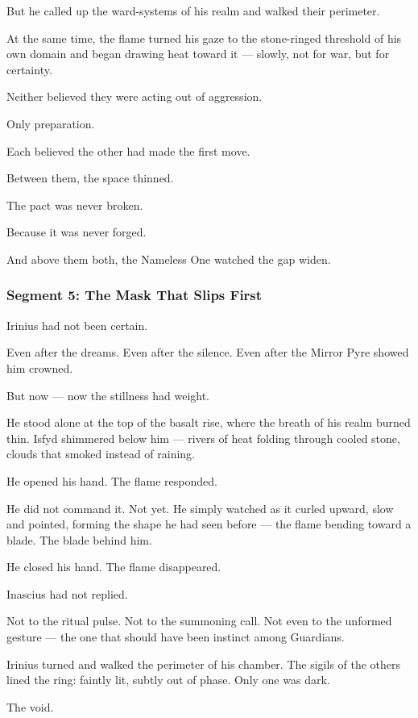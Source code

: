 \documentclass[9pt]{article}
\begin{document}
But he called up the ward-systems of his realm and walked their perimeter.

At the same time, the flame turned his gaze to the stone-ringed threshold of his own domain and began drawing heat toward it — slowly, not for war, but for certainty.

Neither believed they were acting out of aggression.

Only preparation.

Each believed the other had made the first move.

Between them, the space thinned.

The pact was never broken.

Because it was never forged.

And above them both, the Nameless One watched the gap widen.


\newpage

\subsubsection*{Segment 5: The Mask That Slips First}

Irinius had not been certain.

Even after the dreams. Even after the silence. Even after the Mirror Pyre showed him crowned.

But now — now the stillness had weight.

He stood alone at the top of the basalt rise, where the breath of his realm burned thin. Isfyd shimmered below him — rivers of heat folding through cooled stone, clouds that smoked instead of raining.

He opened his hand. The flame responded.

He did not command it. Not yet. He simply watched as it curled upward, slow and pointed, forming the shape he had seen before — the flame bending toward a blade. The blade behind him.

He closed his hand. The flame disappeared.

Inascius had not replied.

Not to the ritual pulse. Not to the summoning call. Not even to the unformed gesture — the one that should have been instinct among Guardians.

Irinius turned and walked the perimeter of his chamber. The sigils of the others lined the ring: faintly lit, subtly out of phase. Only one was dark.

The void.
\end{document}
